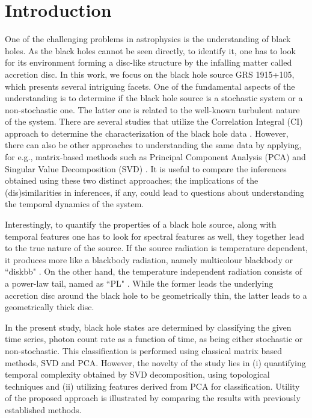 \documentclass[10pt,conference]{IEEEtran}
\begin{document}
\section{Introduction}
One of the challenging problems in astrophysics is the understanding of black holes. As the black holes cannot be seen directly, to identify it, one has to look for its environment forming a disc-like structure by the infalling matter called accretion disc. In this work, we focus on the black hole source GRS 1915+105, which presents several intriguing facets. One of the fundamental aspects of the understanding is to determine if the black hole source is a stochastic system or a non-stochastic one. The latter one is related to the well-known turbulent nature of the system. There are several studies that utilize the Correlation Integral (CI) approach to determine the characterization of the black hole data \cite{Mukhopadhyay2004, misra2006}. However, there can also be other approaches to understanding the same data by applying, for e.g.,  matrix-based methods such as Principal Component Analysis (PCA) and Singular Value Decomposition (SVD) . It is useful to compare the inferences obtained using these two distinct approaches; the implications of the (dis)similarities in inferences, if any, could lead to questions about understanding the temporal dynamics of the system.

Interestingly, to quantify the properties of a black hole source, along with temporal features one has to look for spectral features as well, they together lead to the true nature of the source. If the source radiation is temperature dependent, it produces more like a blackbody radiation, namely multicolour blackbody or ``diskbb" \cite{Shakura1973}. On the other hand, the temperature independent radiation consists of a power-law tail, named as ``PL" \cite{chakrabarti1995,narayan1994}.
While the former leads the underlying accretion disc around the black hole to be geometrically thin, the latter leads to a geometrically thick disc.

In the present study, black hole states are determined by  classifying the given time series, photon count rate as a function of time,  as being either stochastic or non-stochastic. This classification is performed using classical matrix based methods, SVD and PCA. However, the novelty of the study lies in (i) quantifying temporal complexity obtained by SVD decomposition, using topological techniques and (ii) utilizing features derived from PCA for classification. Utility of the proposed approach is illustrated by comparing the results with previously established methods.
\end{document}
